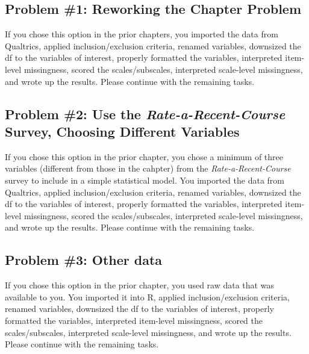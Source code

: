 \documentclass[
  11pt,
]{book}
\begin{document}
\hypertarget{problem-1-reworking-the-chapter-problem-1}{%
\subsection{Problem \#1: Reworking the Chapter Problem}\label{problem-1-reworking-the-chapter-problem-1}}

If you chose this option in the prior chapters, you imported the data from Qualtrics, applied inclusion/exclusion criteria, renamed variables, downsized the df to the variables of interest, properly formatted the variables, interpreted item-level missingness, scored the scales/subscales, interpreted scale-level missingness, and wrote up the results. Please continue with the remaining tasks.

\hypertarget{problem-2-use-the-rate-a-recent-course-survey-choosing-different-variables-2}{%
\subsection{\texorpdfstring{Problem \#2: Use the \emph{Rate-a-Recent-Course} Survey, Choosing Different Variables}{Problem \#2: Use the Rate-a-Recent-Course Survey, Choosing Different Variables}}\label{problem-2-use-the-rate-a-recent-course-survey-choosing-different-variables-2}}

If you chose this option in the prior chapter, you chose a minimum of three variables (different from those in the cahpter) from the \emph{Rate-a-Recent-Course} survey to include in a simple statistical model. You imported the data from Qualtrics, applied inclusion/exclusion criteria, renamed variables, downsized the df to the variables of interest, properly formatted the variables, interpreted item-level missingness, scored the scales/subscales, interpreted scale-level missingness, and wrote up the results. Please continue with the remaining tasks.

\hypertarget{problem-3-other-data-2}{%
\subsection{Problem \#3: Other data}\label{problem-3-other-data-2}}

If you chose this option in the prior chapter, you used raw data that was available to you. You imported it into R, applied inclusion/exclusion criteria, renamed variables, downsized the df to the variables of interest, properly formatted the variables, interpreted item-level missingness, scored the scales/subscales, interpreted scale-level missingness, and wrote up the results. Please continue with the remaining tasks.
\end{document}
